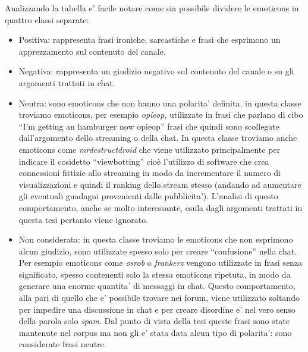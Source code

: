 \documentclass[a4paper,12pt,openright,twoside]{report}
\theoremstyle{definition}
\begin{document}
Analizzando la tabella e' facile notare come sia possibile dividere le emoticons in quattro classi separate:
\begin{itemize}
\item Positiva: rappresenta frasi ironiche, sarcastiche e frasi che esprimono un apprezzamento sul contenuto del canale.
\item Negativa: rappresenta un giudizio negativo sul contenuto del canale o su gli argomenti trattati in chat.
\item Neutra: sono emoticons che non hanno una polarita' definita, in questa classe troviamo emoticons, per esempio \emph{opieop}, utilizzate in frasi che parlano di 
cibo ``I'm getting an hamburger now opieop'' frasi che quindi sono scollegate dall'argomento dello streaming o della chat. 
In questa classe troviamo anche emoticons come \emph{mrdestructdroid} che viene utilizzato principalmente per indicare il cosidetto ``viewbotting'' 
cioè l'utilizzo di software che crea connessioni fittizie allo streaming in modo da incrementare il numero di visualizzazioni 
e quindi il ranking dello stream stesso (andando ad aumentare gli eventuali guadagni provenienti dalle pubblicita'). 
L'analisi di questo comportamento, anche se molto interessante, esula dagli argomenti trattati in questa tesi pertanto viene ignorato.
\item Non considerata: in questa classe troviamo le emoticons che non esprimono alcun giudizio, sono utilizzate spesso solo per creare ``confusione'' nella chat.
Per esempio emoticons come \emph{osrob} o \emph{frankerz} vengono utilizzate in frasi senza significato, spesso contenenti solo la stessa emoticons ripetuta,
in modo da generare una enorme quantita' di messaggi in chat. Questo comportamento, alla pari di quello che e' possibile trovare nei forum, viene utilizzato 
soltando per impedire una discussione in chat e per creare disordine e' nel vero senso della parola solo \emph{spam}. Dal punto di vista della tesi
queste frasi sono state mantenute nel corpus ma non gli e' stata data alcun tipo di polarita': sono considerate frasi neutre.
\end{itemize}
\end{document}
